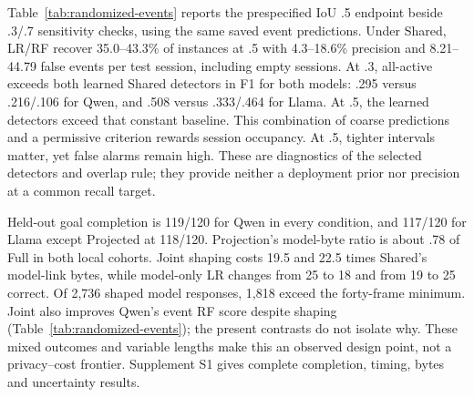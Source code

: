 Table~\ref{tab:randomized-events} reports the prespecified IoU .5 endpoint beside .3/.7 sensitivity checks, using the same saved event predictions. Under Shared, LR/RF recover 35.0--43.3\% of instances at .5 with 4.3--18.6\% precision and 8.21--44.79 false events per test session, including empty sessions. At .3, all-active exceeds both learned Shared detectors in F1 for both models: .295 versus .216/.106 for Qwen, and .508 versus .333/.464 for Llama. At .5, the learned detectors exceed that constant baseline. This combination of coarse predictions and a permissive criterion rewards session occupancy. At .5, tighter intervals matter, yet false alarms remain high. These are diagnostics of the selected detectors and overlap rule; they provide neither a deployment prior nor precision at a common recall target.



Held-out goal completion is 119/120 for Qwen in every condition, and 117/120 for Llama except Projected at 118/120. Projection's model-byte ratio is about .78 of Full in both local cohorts. Joint shaping costs 19.5 and 22.5 times Shared's model-link bytes, while model-only LR changes from 25 to 18 and from 19 to 25 correct. Of 2,736 shaped model responses, 1,818 exceed the forty-frame minimum. Joint also improves Qwen's event RF score despite shaping (Table~\ref{tab:randomized-events}); the present contrasts do not isolate why. These mixed outcomes and variable lengths make this an observed design point, not a privacy--cost frontier. Supplement S1 gives complete completion, timing, bytes and uncertainty results.
